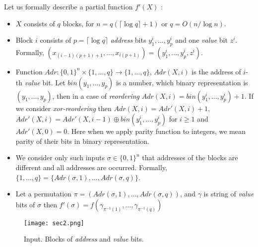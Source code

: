 \documentclass{llncs}
\begin{document}
Let us formally describe  a partial function $f'(X)$ 
:
\begin{itemize}
\item $X$ consists of $q$ blocks, for $n=q(\lceil\log q\rceil+1)$ or $q= O(n/\log{n})$.

\item Block $i$ consists of $p=\lceil\log{q}\rceil$ {\em address} bits $y^i_1,\dots,y^i_{p}$ and one {\em value} bit $z^i$. Formally, $(x_{(i-1)(p+1)+1},\dots,x_{i(p+1)})=(y^i_1,\dots,y^i_{p},z^i)$.

\item Function $Adr:\{0,1\}^n\times\{ 1, \ldots ,q\} \to \{ 1, \ldots ,q\}$, $Adr(X,i)$ is the address of $i$-th {\em value} bit. Let $bin(y_1,\dots,y_p)$ is a number, which binary representation is  $(y_1,\dots,y_{p})$, then in a case of {\em reordering} $Adr(X,i)=bin(y^i_1,\dots,y^i_{p})+1$. If we consider {\em xor-reordering} then $Adr(X,i)=Adr'(X,i)+1$, $Adr'(X,i)=Adr'(X,i-1)\oplus bin(y^i_1,\dots,y^i_{p})$ for $i\geq 1$ and $Adr'(X,0)=0$. Here when we apply parity function to integers, we mean parity of their bits in binary representation.
\item We consider only such inputs $\sigma\in\{0,1\}^n$ that addresses of the blocks are different and all addresses are occurred. Formally, $\{1,\dots,q\}=\{Adr(\sigma,1),\dots,Adr(\sigma,q)\}$.  
\item Let a permutation $\pi=(Adr(\sigma,1),\dots,Adr(\sigma,q))$, and $\gamma$ is string of {\em value} bits of $\sigma$ then $f'(\sigma)=f(\gamma_{\pi^{-1}(1)},\dots, \gamma_{\pi^{-1}(q)})$
\end{itemize}

\begin{figure}[tbh]
\begin{center}
\texttt{[image: sec2.png]}
\end{center}
\caption{Input. Blocks of {\em address} and {\em value} bits.}
\label{fig:address-value}
\end{figure}
\end{document}
